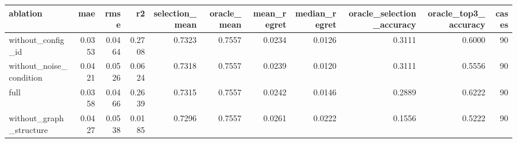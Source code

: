 \begin{tabular}{lrrrrrrrrrr}
\toprule
ablation & mae & rmse & r2 & selection_mean & oracle_mean & mean_regret & median_regret & oracle_selection_accuracy & oracle_top3_accuracy & cases \\
\midrule
without_config_id & 0.0353 & 0.0464 & 0.2708 & 0.7323 & 0.7557 & 0.0234 & 0.0126 & 0.3111 & 0.6000 & 90 \\
without_noise_condition & 0.0421 & 0.0526 & 0.0624 & 0.7318 & 0.7557 & 0.0239 & 0.0120 & 0.3111 & 0.5556 & 90 \\
full & 0.0358 & 0.0466 & 0.2639 & 0.7315 & 0.7557 & 0.0242 & 0.0146 & 0.2889 & 0.6222 & 90 \\
without_graph_structure & 0.0427 & 0.0538 & 0.0185 & 0.7296 & 0.7557 & 0.0261 & 0.0222 & 0.1556 & 0.5222 & 90 \\
\bottomrule
\end{tabular}
